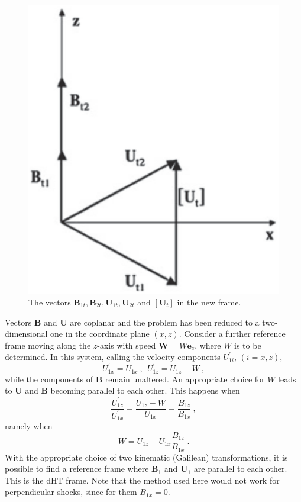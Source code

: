\documentclass[12pt,a4paper]{article}
\renewcommand{\vec}[1]{\boldsymbol{#1}}
\begin{document}
\begin{figure}
\centering
\includegraphics[height=5.cm,angle=0]{Oblique.eps}
\caption{
The vectors $\vec{B}_{1t}, \vec{B}_{2t}, \vec{U}_{1t}, \vec{U}_{2t}$ and $[\vec{U}_t]$ in the new frame.
} 
\label{fig:Oblique}
\end{figure}

Vectors $\vec{B}$ and $\vec{U}$ are coplanar and the problem has been reduced to a two-dimensional one in the coordinate
plane $(x, z)$. Consider a further reference frame moving along the $z$-axis with speed $\vec{W} = W \vec{e}_z$, where $W$ is to be determined. In this system, calling the velocity components $U_{1i}^\prime$, $(i = x, z)$, 
\begin{equation}
U_{1x}^\prime = U_{1x} ~, ~~ U_{1z}^\prime = U_{1z} - W ~,
\end{equation}
while the components of $\vec{B}$ remain unaltered. An appropriate choice for $W$ leads to $\vec{U}$ and $\vec{B}$ becoming parallel to each other. This happens when
\begin{equation}
\dfrac{U_{1z}^\prime}{U_{1x}^\prime} = \dfrac{U_{1z} -W}{U_{1x}}  =\dfrac{B_{1z}}{B_{1x}} ~,
\end{equation}
namely when 
\begin{equation}
W = U_{1z} - U_{1x} \dfrac{B_{1z}}{B_{1x}} ~.
\end{equation}
With the appropriate choice of two kinematic (Galilean) transformations, it is possible to find a reference frame where $\vec{B}_1$  and $\vec{U}_1$  are parallel to each other. This is the dHT frame. Note that the method used here would not work
for perpendicular shocks, since for them $B_{1x} = 0$.
\end{document}
